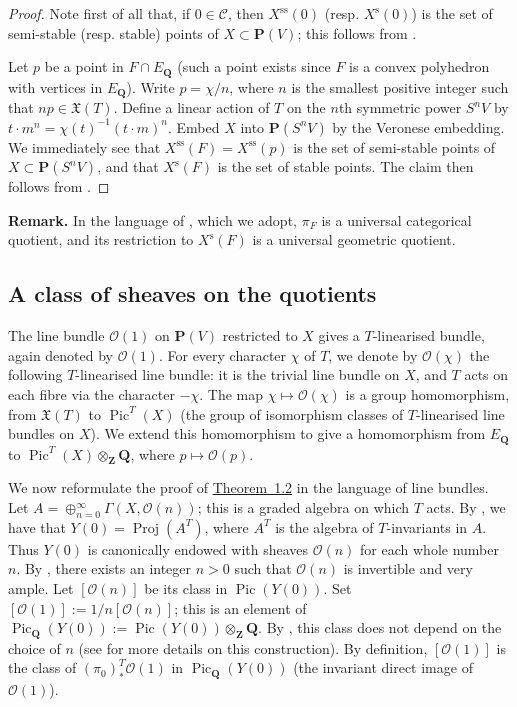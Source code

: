 \documentclass{article}
\newenvironment{rmenv}[1]
  {\phantomsection\par\medskip\noindent\textbf{#1.}\rmfamily}
  {\medskip}
\newcommand{\scr}[1]{{\mathscr{#1}}}
\newcommand{\PP}{\mathbf{P}}
\newcommand{\QQ}{\mathbf{Q}}
\newcommand{\ZZ}{\mathbf{Z}}
\newcommand{\s}{\mathrm{s}}
\renewcommand{\ss}{\mathrm{ss}}
\DeclareMathOperator{\Pic}{Pic}
\DeclareMathOperator{\Proj}{Proj}
\begin{document}
\begin{proof}
  Note first of all that, if $0\in\mathcal{C}$, then $X^\ss(0)$ (resp. $X^\s(0)$) is the set of semi-stable (resp. stable) points of $X\subset\PP(V)$;
  this follows from \cite[Theorem~2.1]{MF}.

  Let $p$ be a point in $F\cap E_\QQ$ (such a point exists since $F$ is a convex polyhedron with vertices in $E_\QQ$).
  Write $p=\chi/n$, where $n$ is the smallest positive integer such that $np\in\mathfrak{X}(T)$.
  Define a linear action of $T$ on the $n$th symmetric power $S^nV$ by $t\cdot m^n = \chi(t)^{-1}(t\cdot m)^n$.
  Embed $X$ into $\PP(S^nV)$ by the Veronese embedding.
  We immediately see that $X^\ss(F)=X^\ss(p)$ is the set of semi-stable points of $X\subset\PP(S^nV)$, and that $X^\s(F)$ is the set of stable points.
  The claim then follows from \cite[1.4]{MF}.
\end{proof}

\begin{rmenv}{Remark}
  In the language of \cite[Chapter~1]{MF}, which we adopt, $\pi_F$ is a universal categorical quotient, and its restriction to $X^\s(F)$ is a universal geometric quotient.
\end{rmenv}


\subsection{A class of sheaves on the quotients}
\label{1.3}

The line bundle $\scr{O}(1)$ on $\PP(V)$ restricted to $X$ gives a $T$-linearised bundle, again denoted by $\scr{O}(1)$.
For every character $\chi$ of $T$, we denote by $\scr{O}(\chi)$ the following $T$-linearised line bundle:
it is the trivial line bundle on $X$, and $T$ acts on each fibre via the character $-\chi$.
The map $\chi\mapsto\scr{O}(\chi)$ is a group homomorphism, from $\mathfrak{X}(T)$ to $\Pic^T(X)$ (the group of isomorphism classes of $T$-linearised line bundles on $X$).
We extend this homomorphism to give a homomorphism from $E_\QQ$ to $\Pic^T(X)\otimes_\ZZ\QQ$, where $p\mapsto\scr{O}(p)$.

We now reformulate the proof of \hyperref[1.2-theorem]{Theorem~1.2} in the language of line bundles.
Let $A=\oplus_{n=0}^\infty\Gamma(X,\scr{O}(n))$;
this is a graded algebra on which $T$ acts.
By \cite[1.11]{MF}, we have that $Y(0)=\Proj(A^T)$, where $A^T$ is the algebra of $T$-invariants in $A$.
Thus $Y(0)$ is canonically endowed with sheaves $\scr{O}(n)$ for each whole number $n$.
By \cite[8.14.4]{EGAII}, there exists an integer $n>0$ such that $\scr{O}(n)$ is invertible and very ample.
Let $[\scr{O}(n)]$ be its class in $\Pic(Y(0))$.
Set $[\scr{O}(1)] := 1/n[\scr{O}(n)]$;
this is an element of $\Pic_\QQ(Y(0)) := \Pic(Y(0))\otimes_\ZZ\QQ$.
By \cite[8.14.12]{EGAII}, this class does not depend on the choice of $n$ (see \cite{Dem} for more details on this construction).
By definition, $[\scr{O}(1)]$ is the class of $(\pi_0)_*^T\scr{O}(1)$ in $\Pic_\QQ(Y(0))$ (the invariant direct image of $\scr{O}(1)$).
\end{document}
